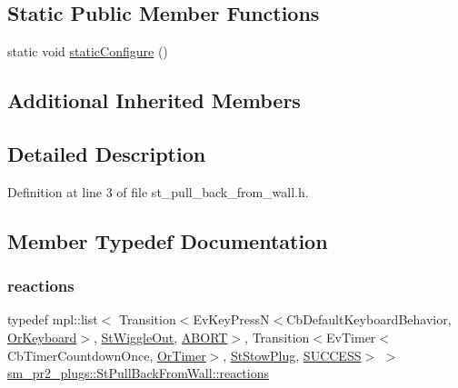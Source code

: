 \subsection*{Static Public Member Functions}
\begin{DoxyCompactItemize}
\item 
static void \hyperlink{structsm__pr2__plugs_1_1StPullBackFromWall_ac2b8294a8c707ed4a4bb867fac511f7f}{static\+Configure} ()
\end{DoxyCompactItemize}
\subsection*{Additional Inherited Members}


\subsection{Detailed Description}


Definition at line 3 of file st\+\_\+pull\+\_\+back\+\_\+from\+\_\+wall.\+h.



\subsection{Member Typedef Documentation}
\mbox{\label{structsm__pr2__plugs_1_1StPullBackFromWall_ae98bee2aa33bf23dc67a168be155e495}} 
\subsubsection{\texorpdfstring{reactions}{reactions}}
{\footnotesize\ttfamily typedef mpl\+::list$<$ Transition$<$Ev\+Key\+PressN$<$Cb\+Default\+Keyboard\+Behavior, \hyperlink{classsm__pr2__plugs_1_1OrKeyboard}{Or\+Keyboard}$>$, \hyperlink{structsm__pr2__plugs_1_1StWiggleOut}{St\+Wiggle\+Out}, \hyperlink{classABORT}{A\+B\+O\+RT}$>$, Transition$<$Ev\+Timer$<$Cb\+Timer\+Countdown\+Once, \hyperlink{classsm__pr2__plugs_1_1OrTimer}{Or\+Timer}$>$, \hyperlink{structsm__pr2__plugs_1_1StStowPlug}{St\+Stow\+Plug}, \hyperlink{classSUCCESS}{S\+U\+C\+C\+E\+SS}$>$ $>$ \hyperlink{structsm__pr2__plugs_1_1StPullBackFromWall_ae98bee2aa33bf23dc67a168be155e495}{sm\+\_\+pr2\+\_\+plugs\+::\+St\+Pull\+Back\+From\+Wall\+::reactions}}



